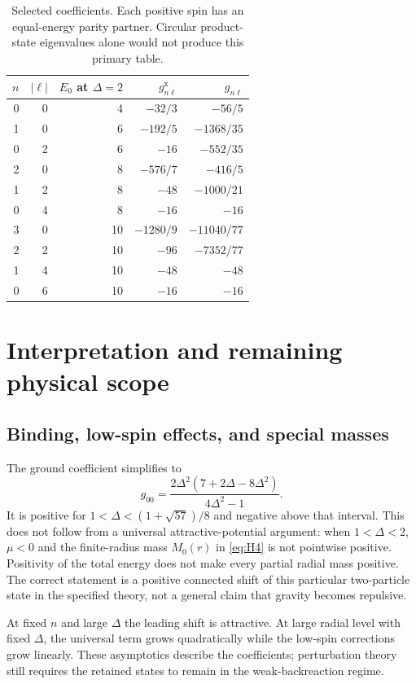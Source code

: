 \documentclass[11pt,a4paper]{article}
\numberwithin{equation}{section}
\theoremstyle{remark}\newtheorem{remark}[theorem]{Remark}
\begin{document}
\begin{table}[ht]
\centering
\begin{tabular}{rrrrr}
\toprule
$n$ & $|\ell|$ & $E_0$ at $\Delta=2$ & $g^{\mathrm x}_{n\ell}$ & $g_{n\ell}$\\
\midrule
0&0&4&$-32/3$&$-56/5$\\
1&0&6&$-192/5$&$-1368/35$\\
0&2&6&$-16$&$-552/35$\\
2&0&8&$-576/7$&$-416/5$\\
1&2&8&$-48$&$-1000/21$\\
0&4&8&$-16$&$-16$\\
3&0&10&$-1280/9$&$-11040/77$\\
2&2&10&$-96$&$-7352/77$\\
1&4&10&$-48$&$-48$\\
0&6&10&$-16$&$-16$\\
\bottomrule
\end{tabular}
\caption{Selected coefficients. Each positive spin has an equal-energy parity partner. Circular product-state eigenvalues alone would not produce this primary table.}
\label{tab:spectrum}
\end{table}

\section{Interpretation and remaining physical scope}

\subsection{Binding, low-spin effects, and special masses}

The ground coefficient simplifies to
\begin{equation}
 g_{00}=\frac{2\Delta^2(7+2\Delta-8\Delta^2)}{4\Delta^2-1}.
\end{equation}
It is positive for $1<\Delta<(1+\sqrt{57})/8$ and negative above that interval. This does not follow from a universal attractive-potential argument: when $1<\Delta<2$, $\mu<0$ and the finite-radius mass $M_0(r)$ in \eqref{eq:H4} is not pointwise positive. Positivity of the total energy does not make every partial radial mass positive. The correct statement is a positive connected shift of this particular two-particle state in the specified theory, not a general claim that gravity becomes repulsive.

At fixed $n$ and large $\Delta$ the leading shift is attractive. At large radial level with fixed $\Delta$, the universal term grows quadratically while the low-spin corrections grow linearly. These asymptotics describe the coefficients; perturbation theory still requires the retained states to remain in the weak-backreaction regime.
\end{document}
